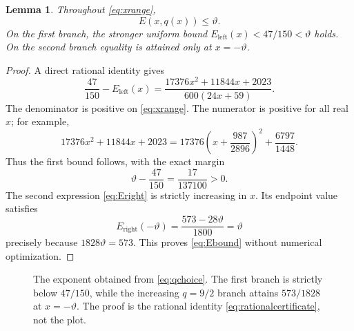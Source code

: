 \documentclass[11pt,reqno]{amsart}
\numberwithin{equation}{section}
\newtheorem{lemma}[lemma]{Lemma}
\theoremstyle{definition}
\theoremstyle{remark}
\newcommand{\vth}{\vartheta}
\begin{document}
\begin{lemma}\label{lem:exponent}
Throughout \eqref{eq:xrange},
\begin{equation}\label{eq:Ebound}
 E(x,q(x))\le\vth.
\end{equation}
On the first branch, the stronger uniform bound $E_{\mathrm{left}}(x)<47/150<\vth$ holds.
On the second branch equality is attained only at $x=-\vth$.
\end{lemma}
\begin{proof}
A direct rational identity gives
\begin{equation}\label{eq:rationalcertificate}
 \frac{47}{150}-E_{\mathrm{left}}(x)
 =\frac{17376x^2+11844x+2023}{600(24x+59)}.
\end{equation}
The denominator is positive on \eqref{eq:xrange}.
The numerator is positive for all real $x$; for example,
\begin{equation}\label{eq:positivesquare}
 17376x^2+11844x+2023
 =17376\left(x+\frac{987}{2896}\right)^2+\frac{6797}{1448}.
\end{equation}
Thus the first bound follows, with the exact margin
\begin{equation}\label{eq:47margin}
 \vth-\frac{47}{150}=\frac{17}{137100}>0.
\end{equation}
The second expression \eqref{eq:Eright} is strictly increasing in $x$.
Its endpoint value satisfies
\[
 E_{\mathrm{right}}(-\vth)=\frac{573-28\vth}{1800}=\vth
\]
precisely because $1828\vth=573$.
This proves \eqref{eq:Ebound} without numerical optimization.
\end{proof}

\begin{figure}[tb]
\centering
{}
\caption{The exponent obtained from \eqref{eq:qchoice}. The first branch is strictly below $47/150$, while the increasing $q=9/2$ branch attains $573/1828$ at $x=-\vartheta$.
The proof is the rational identity \eqref{eq:rationalcertificate}, not the plot.}
\label{fig:exponent}
\end{figure}
\end{document}

